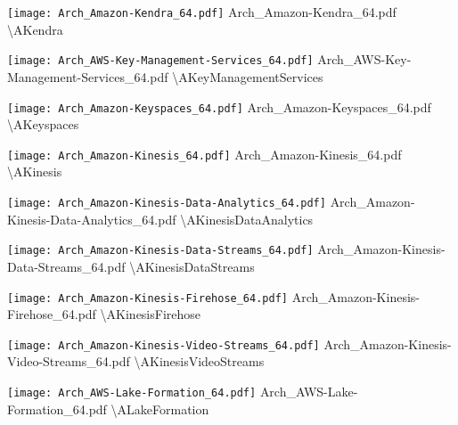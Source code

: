  {\texttt{[image: Arch\_Amazon-Kendra\_64.pdf]}} {Arch\_Amazon-Kendra\_64.pdf} {{\textbackslash}AKendra}

 {\texttt{[image: Arch\_AWS-Key-Management-Services\_64.pdf]}} {Arch\_AWS-Key-Management-Services\_64.pdf} {{\textbackslash}AKeyManagementServices}

 {\texttt{[image: Arch\_Amazon-Keyspaces\_64.pdf]}} {Arch\_Amazon-Keyspaces\_64.pdf} {{\textbackslash}AKeyspaces}

 {\texttt{[image: Arch\_Amazon-Kinesis\_64.pdf]}} {Arch\_Amazon-Kinesis\_64.pdf} {{\textbackslash}AKinesis}

 {\texttt{[image: Arch\_Amazon-Kinesis-Data-Analytics\_64.pdf]}} {Arch\_Amazon-Kinesis-Data-Analytics\_64.pdf} {{\textbackslash}AKinesisDataAnalytics}

 {\texttt{[image: Arch\_Amazon-Kinesis-Data-Streams\_64.pdf]}} {Arch\_Amazon-Kinesis-Data-Streams\_64.pdf} {{\textbackslash}AKinesisDataStreams}

 {\texttt{[image: Arch\_Amazon-Kinesis-Firehose\_64.pdf]}} {Arch\_Amazon-Kinesis-Firehose\_64.pdf} {{\textbackslash}AKinesisFirehose}

 {\texttt{[image: Arch\_Amazon-Kinesis-Video-Streams\_64.pdf]}} {Arch\_Amazon-Kinesis-Video-Streams\_64.pdf} {{\textbackslash}AKinesisVideoStreams}

 {\texttt{[image: Arch\_AWS-Lake-Formation\_64.pdf]}} {Arch\_AWS-Lake-Formation\_64.pdf} {{\textbackslash}ALakeFormation}

